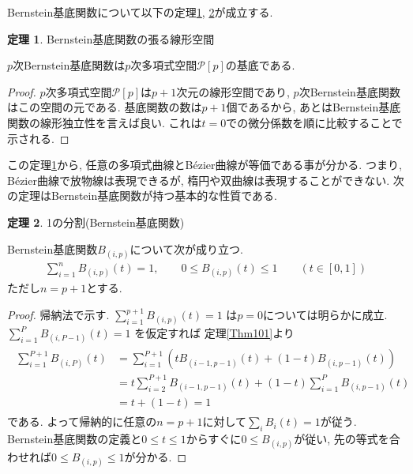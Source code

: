 \documentclass{jsarticle}
\newcommand\Pare[1]{\left(#1\right)}
\theoremstyle{definition}%
\newtheorem{thm}{定理}
\begin{document}
Bernstein基底関数について以下の定理\ref{Thm106}, \ref{Thm107}が成立する.
\begin{screen}
	\begin{thm}
		\label{Thm106}
		Bernstein基底関数の張る線形空間

		$p$次Bernstein基底関数は$p$次多項式空間$\mathcal{P}[p]$の基底である.
	\end{thm}
\end{screen}
\begin{proof}
	$p$次多項式空間$\mathcal{P}[p]$は$p+1$次元の線形空間であり, $p$次Bernstein基底関数はこの空間の元である.
	基底関数の数は$p+1$個であるから, あとはBernstein基底関数の線形独立性を言えば良い.
	これは$t=0$での微分係数を順に比較することで示される.
\end{proof}
この定理\ref{Thm106}から, 任意の多項式曲線\footnotemark とB\'ezier曲線が等価である事が分かる.
つまり, B\'ezier曲線で放物線は表現できるが, 楕円や双曲線は表現することができない.
次の定理はBernstein基底関数が持つ基本的な性質である.
\begin{screen}
	\begin{thm}
		\label{Thm107}
		1の分割(Bernstein基底関数)

        Bernstein基底関数$B_{(i,p)}$について次が成り立つ.
		\begin{align}
			\sum_{i=1}^{n} B_{(i,p)}(t)= 1, \qquad 0\le B_{(i,p)}(t)\le 1 \qquad(t\in[0,1])
		\end{align}
        ただし$n=p+1$とする.
	\end{thm}
\end{screen}
\begin{proof}\hspace{-0.5em}\footnotemark
	帰納法で示す.
	$
		\displaystyle
		\sum_{i=1}^{p+1} B_{(i,p)}(t)= 1
	$
	は$p=0$については明らかに成立.
	$
		\displaystyle
		\sum_{i=1}^{P} B_{(i,P-1)}(t)= 1
	$
	を仮定すれば
	定理\ref{Thm101}より
	\begin{align}
		\begin{aligned}
            \sum_{i=1}^{P+1} B_{(i,P)}(t)
			&=\sum_{i=1}^{P+1} \Pare{tB_{(i-1,p-1)}(t)+(1-t)B_{(i,p-1)}(t)} \\
			&=t\sum_{i=2}^{P+1}B_{(i-1,p-1)}(t)+(1-t)\sum_{i=1}^{P}B_{(i,p-1)}(t) \\
			&=t+(1-t)
            =1
		\end{aligned}
	\end{align}
	である.
    よって帰納的に任意の$n=p+1$に対して$\sum\limits_{i}B_i(t)=1$が従う.
    Bernstein基底関数の定義と$0\le t\le 1$からすぐに$0\le B_{(i,p)}$が従い, 先の等式を合わせれば$0\le B_{(i,p)}\le 1$が分かる.
\end{proof}
\end{document}
